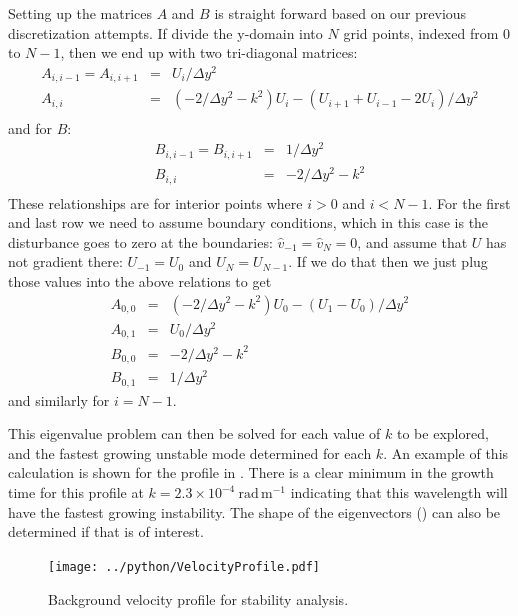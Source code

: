 \documentclass[11pt]{article}
\begin{document}
Setting up the matrices $A$ and $B$ is straight forward based on our previous discretization attempts.  If divide the y-domain into $N$ grid points, indexed from $0$ to $N-1$, then we end up with two tri-diagonal matrices: 
\begin{eqnarray*}
  A_{i, i-1} = A_{i, i+1} & = & U_i / \Delta y^2\\
  A_{i, i} & = &  \left(-2 /\Delta y^2 -k^2\right)U_i -(U_{i+1} + U_{i-1} -2 U_i)/\Delta y ^2\\
\end{eqnarray*} 
and for $B$:
\begin{eqnarray*}
  B_{i, i-1} = B_{i, i+1} & = & 1 / \Delta y^2\\
  B_{i, i} & = &  -2 /\Delta y^2 -k^2 \\
\end{eqnarray*} 
These relationships are for interior points where $i>0$ and $i<N-1$.  For the first and last row we need to assume boundary conditions, which in this case is the disturbance goes to zero at the boundaries: $\hat{v}_{-1} = \hat{v}_{N} = 0$, and assume that $U$ has not gradient there: $U_{-1} = U_0$ and $U_{N} = U_{N-1}$.  If we do that then we just plug those values into the above relations to get 
\begin{eqnarray*}
A_{0, 0} &=& \left(-2 /\Delta y^2 -k^2\right)U_0 -(U_1 - U_0)/\Delta y ^2\\
A_{0, 1} & = &U_0/\Delta y^2\\
B_{0, 0} & = &  -2 /\Delta y^2 -k^2 \\
B_{0, 1} & = & 1 / \Delta y^2
\end{eqnarray*}
and similarly for $i=N-1$.   

This eigenvalue problem can then be solved for each value of $k$ to be explored, and the fastest growing unstable mode determined for each $k$.  An example of this calculation is shown for the profile in .  There is a clear minimum in the growth time for this profile at $k=2.3\times10^{-4}\ \mathrm{rad\,m^{-1}}$ indicating that this wavelength will have the fastest growing instability.  The shape of the eigenvectors () can also be determined if that is of interest.        

\begin{figure}[hbtp]
  \begin{center}
    \texttt{[image: ../python/VelocityProfile.pdf]}
  \end{center}
    \caption{Background velocity profile for stability analysis.}
    \label{fig:VelocityProfile}
\end{figure}
\end{document}
